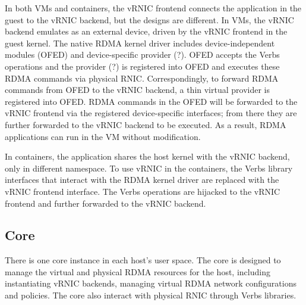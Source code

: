 
In both VMs and containers, the vRNIC frontend connects the application in the guest to the vRNIC backend, but the designs are different. In VMs, the vRNIC backend emulates as an external device, driven by the vRNIC frontend in the guest kernel. The native RDMA kernel driver includes device-independent modules (OFED) and device-specific provider (?). OFED accepts the Verbs operations and the provider (?) is registered into OFED and executes these RDMA commands via physical RNIC. Correspondingly, to forward RDMA commands from OFED to the vRNIC backend, a thin virtual provider is registered into OFED. RDMA commands in the OFED will be forwarded to the vRNIC frontend via the registered device-specific interfaces; from there
they are further forwarded to the vRNIC backend to be executed. As a result, RDMA applications can run in the VM without modification. 

In containers, the application shares the host kernel with the vRNIC backend, only in different namespace. To use vRNIC in the containers, the Verbs library interfaces that interact with the RDMA kernel driver are replaced with the vRNIC frontend interface. The Verbs operations are hijacked to the vRNIC frontend and further forwarded to the vRNIC backend.

\subsection{\sys Core}

There is one \sys core instance in each host's user space. The \sys core is designed to manage the virtual and physical RDMA resources for the host, including instantiating vRNIC backends, managing virtual RDMA network configurations and policies. The \sys core also interact with physical RNIC through Verbs libraries.

